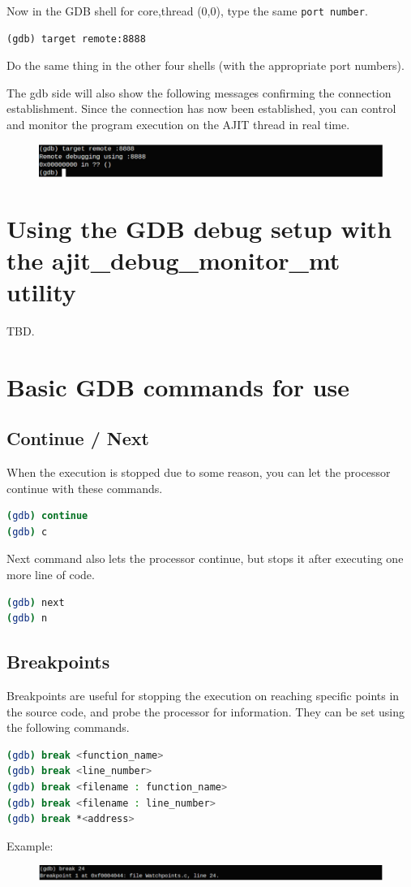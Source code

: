 \documentclass[a4paper, 11pt]{article}
\begin{document}
Now in the GDB shell for core,thread (0,0), type
the same \texttt{port number}.
\begin{verbatim}
(gdb) target remote:8888
\end{verbatim}
Do the same thing in the other four shells (with the appropriate port numbers).

The gdb side will also show the following messages confirming the connection establishment. 
Since the connection has now been established, you can control and monitor the program execution on 
the AJIT thread in real time.
\begin{figure}[H]
	\centering
	\includegraphics[width=0.8\columnwidth]{Figs/second.png}
\end{figure}

\section{Using the GDB debug setup with the ajit\_debug\_monitor\_mt utility}
TBD.

\section{Basic GDB commands for use}

\subsection*{Continue / Next}
When the execution is stopped due to some reason, you can let the processor continue with these commands.
\begin{lstlisting}[language=bash]
(gdb) continue
(gdb) c
\end{lstlisting}
Next command also lets the processor continue, but stops it after executing one more line of code.
\begin{lstlisting}[language=bash]
(gdb) next
(gdb) n
\end{lstlisting}

\subsection{Breakpoints}
Breakpoints are useful for stopping the execution on reaching specific points in the source code, and probe the processor for information. They can be set using the following commands.
\begin{lstlisting}[language=bash]
(gdb) break <function_name>
(gdb) break <line_number>
(gdb) break <filename : function_name>
(gdb) break <filename : line_number>
(gdb) break *<address>
\end{lstlisting}
Example:
\\
\begin{figure}[H]
	\centering
	\includegraphics[width=0.8\columnwidth]{Figs/fourth.png}
\end{figure}
\end{document}
